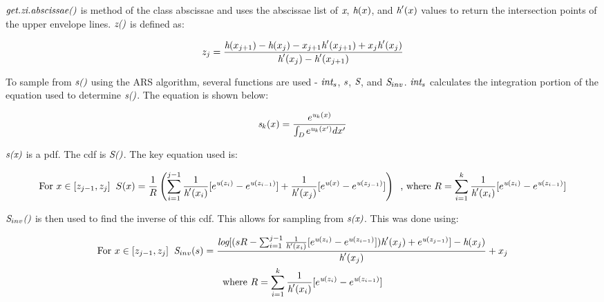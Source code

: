 \documentclass{article}\usepackage[]{graphicx}\usepackage[]{color}
\begin{document}
$\emph{get.zi.abscissae()}$ is method of the class abscissae and uses the abscissae list of $\emph{x}$, $\emph{h}(x)$, and $\emph{h}'(x)$ values to return the intersection points of the upper envelope lines.  $\emph{z()}$ is defined as:

\begin{gather*}
z_{j} = \frac{\emph{h}(x_{j+1}) - \emph{h}(x_j) - x_{j+1}\emph{h}'(x_{j+1}) + x_{j}\emph{h}'(x_{j})}{\emph{h}'(x_{j}) - \emph{h}'(x_{j+1})}
\end{gather*}

To sample from $\emph{s()}$ using the ARS algorithm, several functions are used - $\emph{int}_s$, $\emph{s}$, $\emph{S}$, and $\emph{S}_{inv}$. $\emph{int}_s$ calculates the integration portion of the equation used to determine $\emph{s()}$. The equation is shown below:

\begin{gather*}
\emph{s}_{k}(x) = \frac{e^{\emph{u}_{k}(x)}}{\int_{\emph{D}} e^{\emph{u}_{k}(x')}dx'}
\end{gather*}

$\emph{s(x)}$ is a pdf. The cdf is $\emph{S()}$. The key equation used is:

\begin{gather*}
\text{For } x \in [z_{j-1}, z_{j}] \; \;
S(x) = \frac{1}{R} \left(\sum_{i=1}^{j-1} \frac{1}{\emph{h}'(x_{i})}[e^{\emph{u}(z_{i})} - e^{\emph{u}(z_{i-1})}] + \frac{1}{\emph{h}'(x_{j})}[e^{\emph{u}(x)} - e^{\emph{u}(z_{j-1})}]\right) \; \;
\text{, where } R = \sum_{i=1}^{k}\frac{1}{\emph{h}'(x_{i})}[e^{\emph{u}(z_{i})} - e^{\emph{u}(z_{i-1})}]
\end{gather*}

$\emph{S}_{inv}\emph{()}$ is then used to find the inverse of this cdf.  This allows for sampling from $\emph{s(x)}$. This was done using:

\begin{gather*}
\text{For } x \in [z_{j-1}, z_{j}] \; \;
\emph{S}_{inv}(s) = \frac{\emph{log}[(sR - \sum_{i=1}^{j-1}\frac{1}{\emph{h}'(x_{i})}[e^{\emph{u}(z_{i})} - e^{\emph{u}(z_{i-1})}])\emph{h}'(x_{j}) + e^{\emph{u}(z_{j-1})}] - \emph{h}(x_{j})}{\emph{h}'(x_j)} + x_{j}\\
\text{where } R = \sum_{i=1}^{k}\frac{1}{\emph{h}'(x_{i})}[e^{\emph{u}(z_{i})} - e^{\emph{u}(z_{i-1})}]
\end{gather*}
\end{document}
